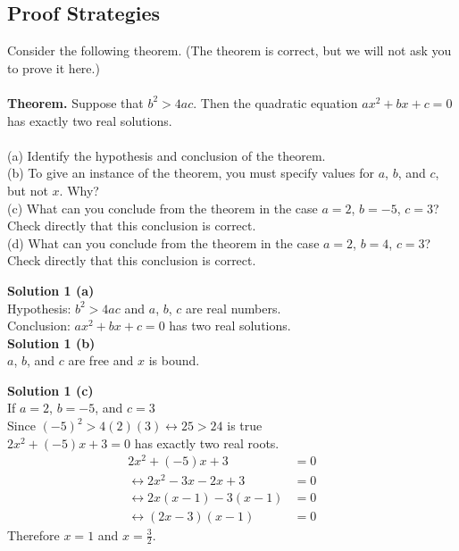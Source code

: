 \subsection{Proof Strategies}

\begin{tcolorbox}[title=Problem 2, breakable]
    Consider the following theorem. (The theorem is correct, but we will not ask you to 
    prove it here.) \\ \\
    \textbf{Theorem.} Suppose that $b^2 > 4ac$. Then the quadratic equation 
    $ax^2 + bx + c = 0$ has exactly two real solutions. \\ \\
    (a) Identify the hypothesis and conclusion of the theorem. \\
    (b) To give an instance of the theorem, you must specify values for $a$, $b$,
    and $c$, but not $x$. Why? \\
    (c) What can you conclude from the theorem in the case $a = 2$, $b = -5$,
    $c = 3$? Check directly that this conclusion is correct. \\
    (d) What can you conclude from the theorem in the case $a = 2$, $b = 4$,
    $c = 3$? Check directly that this conclusion is correct.
\end{tcolorbox}

\textbf{Solution 1 (a)} \\
Hypothesis: $b^2 > 4ac$ and $a$, $b$, $c$ are real numbers. \\
Conclusion: $ax^2 + bx + c = 0$ has two real solutions. \\

\textbf{Solution 1 (b)} \\
$a$, $b$, and $c$ are free and $x$ is bound.

\textbf{Solution 1 (c)} \\
If $a = 2$, $b = -5$, and $c = 3$ \\
Since $(-5)^2 > 4(2)(3) \leftrightarrow 25 > 24$ is true \\
$2x^2 + (-5)x + 3 = 0$ has exactly two real roots. \\
\begin{align}
    2x^2 + (-5)x + 3                      & = 0  &  & \\
    \leftrightarrow 2x^2 - 3x - 2x + 3    & = 0  &  & \\
    \leftrightarrow  2x(x - 1) - 3(x - 1) & = 0  &  & \\
    \leftrightarrow (2x-3)(x - 1)         & = 0
\end{align}
Therefore $x = 1$ and $x = \frac{3}{2}$. \\

